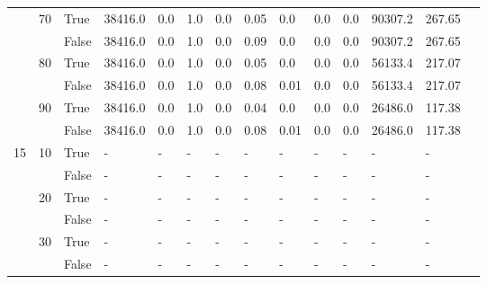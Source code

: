 \begin{landscape}
\begin{small}
\begin{longtable}[c]{@{}lll|ll|ll|ll|ll|lll@{}}
   & 70 & True  & 38416.0         & 0.0            & 1.0           & 0.0           & 0.05          & 0.0           & 0.0           & 0.0           & 90307.2       & 267.65      &  \\
   &    & False & 38416.0         & 0.0            & 1.0           & 0.0           & 0.09          & 0.0           & 0.0           & 0.0           & 90307.2       & 267.65      &  \\
   & 80 & True  & 38416.0         & 0.0            & 1.0           & 0.0           & 0.05          & 0.0           & 0.0           & 0.0           & 56133.4       & 217.07      &  \\
   &    & False & 38416.0         & 0.0            & 1.0           & 0.0           & 0.08          & 0.01          & 0.0           & 0.0           & 56133.4       & 217.07      &  \\
   & 90 & True  & 38416.0         & 0.0            & 1.0           & 0.0           & 0.04          & 0.0           & 0.0           & 0.0           & 26486.0       & 117.38      &  \\
   &    & False & 38416.0         & 0.0            & 1.0           & 0.0           & 0.08          & 0.01          & 0.0           & 0.0           & 26486.0       & 117.38      &  \\
  \midrule
15 & 10 & True  & -               & -              & -             & -             & -             & -             & -             & -             & -             & -           &  \\
   &    & False & -               & -              & -             & -             & -             & -             & -             & -             & -             & -           &  \\
   & 20 & True  & -               & -              & -             & -             & -             & -             & -             & -             & -             & -           &  \\
   &    & False & -               & -              & -             & -             & -             & -             & -             & -             & -             & -           &  \\
   & 30 & True  & -               & -              & -             & -             & -             & -             & -             & -             & -             & -           &  \\
   &    & False & -               & -              & -             & -             & -             & -             & -             & -             & -             & -           &  \\

\end{longtable}
\end{small}
\end{landscape}
